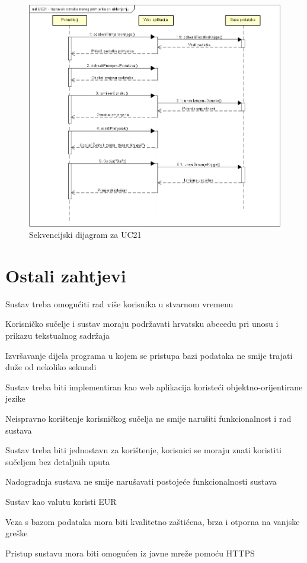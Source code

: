 			\eject
			
				\begin{figure}[H]
					\includegraphics[width=\textwidth]{dijagrami/SequenceDiagram4.PNG} %
					\centering
					\caption{Sekvencijski dijagram za UC21}
					\label{fig:seqdiag4}
				\end{figure}
			
			\eject
			
		\section{Ostali zahtjevi}
		
			\begin{packed_item}
			
				\item Sustav treba omogućiti rad više korisnika u stvarnom vremenu
				\item Korisničko sučelje i sustav moraju podržavati hrvatsku abecedu pri unosu i prikazu tekstualnog sadržaja
				\item Izvršavanje dijela programa u kojem se pristupa bazi podataka ne smije trajati duže od nekoliko sekundi
				\item Sustav treba biti implementiran kao web aplikacija koristeći objektno-orijentirane jezike
				\item Neispravno korištenje korisničkog sučelja ne smije narušiti funkcionalnost i rad sustava
				\item Sustav treba biti jednostavn za korištenje, korisnici se moraju znati koristiti sučeljem bez detaljnih uputa
				\item Nadogradnja sustava ne smije narušavati postojeće funkcionalnosti sustava
				\item Sustav kao valutu koristi EUR
				\item Veza s bazom podataka mora biti kvalitetno zaštićena, brza i otporna na vanjske greške
				\item Pristup sustavu mora biti omogućen iz javne mreže pomoću HTTPS
			\end{packed_item}
